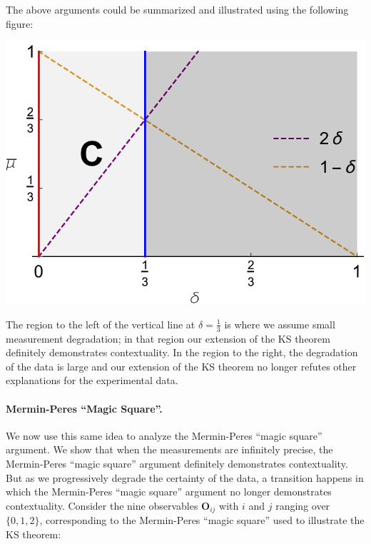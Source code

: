 \documentclass[english,reprint, aps, prl,superscriptaddress, showpacs,
showkeys, longbibliography, amsmath, amssymb, floatfix]{revtex4-1}
\theoremstyle{plain}
\theoremstyle{definition}
\begin{document}
The above arguments could be summarized and illustrated using the
following figure: 
\begin{center}
\includegraphics[scale=0.5]{prop_letter_ajhs_referee_response_nb} 
\par\end{center}

\noindent The region to the left of the vertical line at $\delta=\frac{1}{3}$
is where we assume small measurement degradation; in that region our
extension of the KS theorem definitely demonstrates contextuality.
In the region to the right, the degradation of the data is large and
our extension of the KS theorem no longer refutes other explanations
for the experimental data.

\bigskip{}


\paragraph*{Mermin-Peres ``Magic Square''.}

We now use this same idea to analyze the Mermin-Peres ``magic square''
argument. We show that when the measurements are infinitely precise,
the Mermin-Peres ``magic square'' argument definitely demonstrates
contextuality. But as we progressively degrade the certainty of the
data, a transition happens in which the Mermin-Peres ``magic square''
argument no longer demonstrates contextuality. Consider the nine observables
$\mathbf{O}_{ij}$ with $i$ and $j$ ranging over $\{0,1,2\}$, corresponding
to the Mermin-Peres ``magic square'' used to illustrate the KS theorem:
\end{document}
